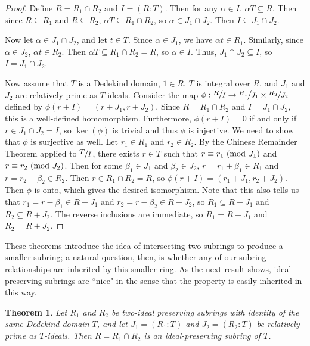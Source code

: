 \documentclass[12pt]{amsart}
\newtheorem{theorem}{Theorem}[section]
\theoremstyle{definition}
\newcommand{\modulo}[1]{\textup{ (mod }#1)}
\newcommand{\quot}[2]{\large\sfrac{#1}{#2}\normalsize}
\begin{document}
	\begin{proof}
		Define $R=R_1\cap R_2$ and $I=(R:T)$. Then for any $\alpha\in I$, $\alpha T\subseteq R$. Then since $R\subseteq R_1$ and $R\subseteq R_2$, $\alpha T\subseteq R_1\cap R_2$, so $\alpha\in J_1\cap J_2$. Then $I\subseteq J_1\cap J_2$.
		
		Now let $\alpha\in J_1\cap J_2$, and let $t\in T$. Since $\alpha\in J_1$, we have $\alpha t\in R_1$. Similarly, since $\alpha\in J_2$, $\alpha t\in R_2$. Then $\alpha T\subseteq R_1\cap R_2=R$, so $\alpha\in I$. Thus, $J_1\cap J_2\subseteq I$, so $I=J_1\cap J_2$.
		
		Now assume that $T$ is a Dedekind domain, $1\in R$, $T$ is integral over $R$, and $J_1$ and $J_2$ are relatively prime as $T$-ideals. Consider the map $\phi:\quot{R}{I}\to \quot{R_1}{J_1}\times \quot{R_2}{J_2}$ defined by $\phi(r+I)=(r+J_1,r+J_2)$. Since $R=R_1\cap R_2$ and $I=J_1\cap J_2$, this is a well-defined homomorphism. Furthermore, $\phi(r+I)=0$ if and only if $r\in J_1\cap J_2=I$, so $\ker(\phi)$ is trivial and thus $\phi$ is injective. We need to show that $\phi$ is surjective as well. Let $r_1\in R_1$ and $r_2\in R_2$. By the Chinese Remainder Theorem applied to $\quot{T}{I}$, there exists $r\in T$ such that $r\equiv r_1\modulo{J_1}$ and $r\equiv r_2\modulo{J_2}$. Then for some $\beta_1\in J_1$ and $\beta_2\in J_2$, $r=r_1+\beta_1\in R_1$ and $r=r_2+\beta_2\in R_2$. Then $r\in R_1\cap R_2=R$, so $\phi(r+I)=(r_1+J_1,r_2+J_2)$. Then $\phi$ is onto, which gives the desired isomorphism. Note that this also tells us that $r_1=r-\beta_1\in R+J_1$ and $r_2=r-\beta_2\in R+J_2$, so $R_1\subseteq R+J_1$ and $R_2\subseteq R+J_2$. The reverse inclusions are immediate, so $R_1=R+J_1$ and $R_2=R+J_2$. 
	\end{proof}
	
	These theorems introduce the idea of intersecting two subrings to produce a smaller subring; a natural question, then, is whether any of our subring relationships are inherited by this smaller ring. As the next result shows, ideal-preserving subrings are ``nice" in the sense that the property is easily inherited in this way.
	
	\begin{theorem}
		Let $R_1$ and $R_2$ be two-ideal preserving subrings with identity of the same Dedekind domain $T$, and let $J_1=(R_1:T)$ and $J_2=(R_2:T)$ be relatively prime as $T$-ideals. Then $R=R_1\cap R_2$ is an ideal-preserving subring of $T$.
	\end{theorem}
	
\end{document}
